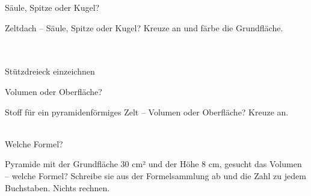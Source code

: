 \setcounter{aufgabe}{11}

\begin{aufgabe}{Säule, Spitze oder Kugel?}
\begin{teile}
\teil Zeltdach – Säule, Spitze oder Kugel? Kreuze an und färbe die Grundfläche.\\ \\ \\ 
\end{teile}
\end{aufgabe}

\begin{aufgabe}{Stützdreieck einzeichnen}
\end{aufgabe}

\begin{aufgabe}{Volumen oder Oberfläche?}
\begin{teile}
\teil Stoff für ein pyramidenförmiges Zelt – Volumen oder Oberfläche? Kreuze an.\\ \\ 
\end{teile}
\end{aufgabe}

\begin{aufgabe}{Welche Formel?}
\begin{teile}
\teil Pyramide mit der Grundfläche $30$ cm² und der Höhe $8$ cm, gesucht das Volumen – welche Formel? Schreibe sie aus der Formelsammlung ab und die Zahl zu jedem Buchstaben. Nichts rechnen.
\end{teile}
\end{aufgabe}

